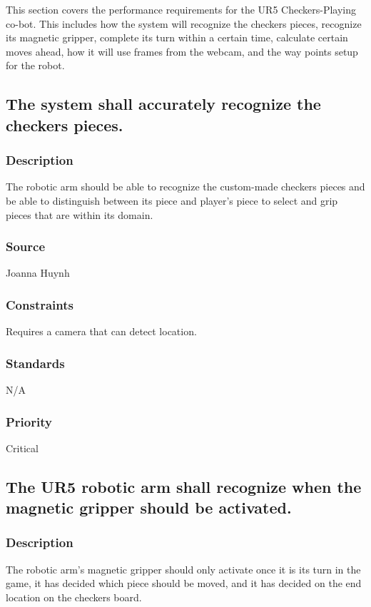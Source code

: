 
This section covers the performance requirements for the UR5 Checkers-Playing co-bot. This includes how the system will recognize the checkers pieces, recognize its magnetic gripper, complete its turn within a certain time, calculate certain moves ahead, how it will use frames from the webcam, and the way points setup for the robot.

\subsection{The system shall accurately recognize the checkers pieces.}
\subsubsection{Description}
The robotic arm should be able to recognize the custom-made checkers pieces and be able to distinguish between its piece and player's piece to select and grip pieces that are within its domain.
\subsubsection{Source}
Joanna Huynh
\subsubsection{Constraints}
Requires a camera that can detect location.
\subsubsection{Standards}
N/A
\subsubsection{Priority}
Critical

\subsection{The UR5 robotic arm shall recognize when the magnetic gripper should be activated.}
\subsubsection{Description}
The robotic arm's magnetic gripper should only activate once it is its turn in the game, it has decided which piece should be moved, and it has decided on the end location on the checkers board. 
